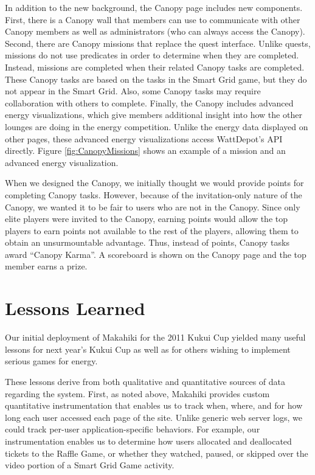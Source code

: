 \documentclass{acm_proc_article-sp}
\begin{document}
In addition to the new background, the Canopy page includes new components. First, there is a Canopy wall that members can use to communicate with other Canopy members as well as administrators (who can always access the Canopy). Second, there are Canopy missions that replace the quest interface. Unlike quests, missions do not use predicates in order to determine when they are completed. Instead, missions are completed when their related Canopy tasks are completed. These Canopy tasks are based on the tasks in the Smart Grid game, but they do not appear in the Smart Grid. Also, some Canopy tasks may require collaboration with others to complete. Finally, the Canopy includes advanced energy visualizations, which give members additional insight into how the other lounges are doing in the energy competition. Unlike the energy data displayed on other pages, these advanced energy visualizations access WattDepot's API directly. Figure \ref{fig:CanopyMissions} shows an example of a mission and an advanced energy visualization.

When we designed the Canopy, we initially thought we would provide points for completing Canopy tasks. However, because of the invitation-only nature of the Canopy, we wanted it to be fair to users who are not in the Canopy. Since only elite players were invited to the Canopy, earning points would allow the top players to earn points not available to the rest of the players, allowing them to obtain an unsurmountable advantage. Thus, instead of points, Canopy tasks award ``Canopy Karma''. A scoreboard is shown on the Canopy page and the top member earns a prize.

\section{Lessons Learned}

Our initial deployment of Makahiki for the 2011 Kukui Cup yielded many
useful lessons for next year's Kukui Cup as well as for others wishing to
implement serious games for energy. 

These lessons derive from both qualitative and quantitative sources of data
regarding the system.  First, as noted above, Makahiki provides custom
quantitative instrumentation that enables us to track when, where, and for how
long each user accessed each page of the site.  Unlike generic web server logs,
we could track per-user application-specific behaviors. For example, our
instrumentation enables us to determine how users allocated and deallocated
tickets to the Raffle Game, or whether they watched, paused, or skipped over
the video portion of a Smart Grid Game activity.
\end{document}
